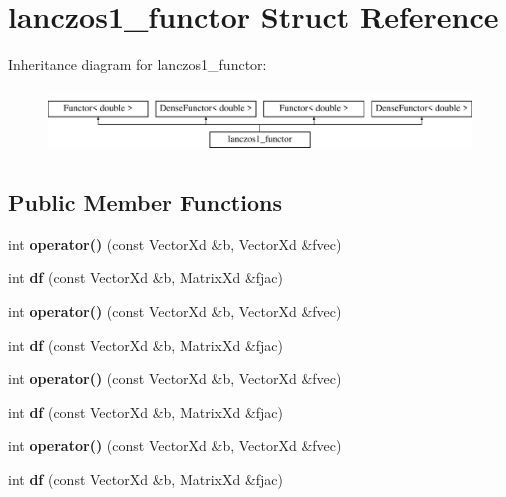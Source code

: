 \hypertarget{structlanczos1__functor}{}\section{lanczos1\+\_\+functor Struct Reference}
\label{structlanczos1__functor}
Inheritance diagram for lanczos1\+\_\+functor\+:\begin{figure}[H]
\begin{center}
\leavevmode
\includegraphics[height=1.728395cm]{structlanczos1__functor}
\end{center}
\end{figure}
\subsection*{Public Member Functions}
\begin{DoxyCompactItemize}
\item 
\mbox{\label{structlanczos1__functor_acae9fe0b5640198a68efe5ab3798704b}} 
int {\bfseries operator()} (const Vector\+Xd \&b, Vector\+Xd \&fvec)
\item 
\mbox{\label{structlanczos1__functor_aa3dc61e2d5a170a5d5a7e1ba33b28678}} 
int {\bfseries df} (const Vector\+Xd \&b, Matrix\+Xd \&fjac)
\item 
\mbox{\label{structlanczos1__functor_acae9fe0b5640198a68efe5ab3798704b}} 
int {\bfseries operator()} (const Vector\+Xd \&b, Vector\+Xd \&fvec)
\item 
\mbox{\label{structlanczos1__functor_aa3dc61e2d5a170a5d5a7e1ba33b28678}} 
int {\bfseries df} (const Vector\+Xd \&b, Matrix\+Xd \&fjac)
\item 
\mbox{\label{structlanczos1__functor_acae9fe0b5640198a68efe5ab3798704b}} 
int {\bfseries operator()} (const Vector\+Xd \&b, Vector\+Xd \&fvec)
\item 
\mbox{\label{structlanczos1__functor_aa3dc61e2d5a170a5d5a7e1ba33b28678}} 
int {\bfseries df} (const Vector\+Xd \&b, Matrix\+Xd \&fjac)
\item 
\mbox{\label{structlanczos1__functor_acae9fe0b5640198a68efe5ab3798704b}} 
int {\bfseries operator()} (const Vector\+Xd \&b, Vector\+Xd \&fvec)
\item 
\mbox{\label{structlanczos1__functor_aa3dc61e2d5a170a5d5a7e1ba33b28678}} 
int {\bfseries df} (const Vector\+Xd \&b, Matrix\+Xd \&fjac)
\end{DoxyCompactItemize}
